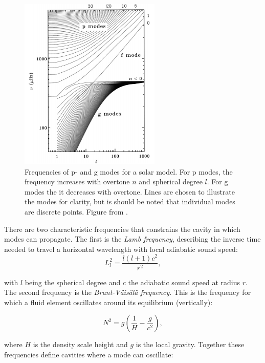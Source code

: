 \begin{figure}[t]
    \centering
    \includegraphics[width=0.6\textwidth]{pandgmodes.png}
    \caption{Frequencies of p- and g modes for a solar model. For p modes, the frequency increases with overtone $n$ and spherical degree $l$. For g modes the it decreases with overtone. Lines are chosen to illustrate the modes for clarity, but is should be noted that individual modes are discrete points. Figure from \citet{aerts2010}. }
    \label{pandgmodes}
\end{figure}


There are two characteristic frequencies that constrains the cavity in which modes can propagate. The first is the \textit{Lamb frequency}, describing the inverse time needed to travel a horizontal wavelength with local adiabatic sound speed: 
\begin{equation}
    L_l^{2} = \frac{l(l+1)c^2}{r^2},
\end{equation}

\noindent with $l$ being the spherical degree and $c$ the adiabatic sound speed at radius $r$. The second frequency is the \textit{Brunt-Väisälä frequency}. This is the frequency for which a fluid element oscillates around its equilibrium (vertically): 

\begin{equation}
    N^2 = g\left(\frac{1}{H}-\frac{g}{c^2}\right),
\end{equation}

\noindent where $H$ is the density scale height and $g$ is the local gravity.
Together these frequencies define cavities where a mode can oscillate: 

